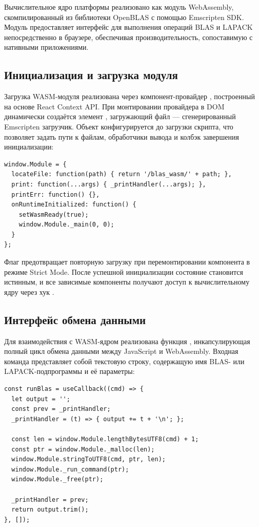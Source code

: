 \documentclass[12pt, oneside]{book}
\begin{document}
    \quad Вычислительное ядро платформы реализовано как модуль WebAssembly, скомпилированный из библиотеки OpenBLAS с помощью Emscripten SDK. Модуль предоставляет интерфейс для выполнения операций BLAS и LAPACK непосредственно в браузере, обеспечивая производительность, сопоставимую с нативными приложениями.

\subsection{Инициализация и загрузка модуля}

    \quad Загрузка WASM-модуля реализована через компонент-провайдер \texttt{}, построенный на основе React Context API. При монтировании провайдера в DOM динамически создаётся элемент \texttt{}, загружающий файл \texttt{} --- сгенерированный Emscripten загрузчик. Объект \texttt{} конфигурируется до загрузки скрипта, что позволяет задать пути к файлам, обработчики вывода и колбэк завершения инициализации:

\begin{verbatim}
window.Module = {
  locateFile: function(path) { return '/blas_wasm/' + path; },
  print: function(...args) { _printHandler(...args); },
  printErr: function() {},
  onRuntimeInitialized: function() {
    setWasmReady(true);
    window.Module._main(0, 0);
  }
};
\end{verbatim}

    \quad Флаг \texttt{} предотвращает повторную загрузку при перемонтировании компонента в режиме Strict Mode. После успешной инициализации состояние \texttt{} становится истинным, и все зависимые компоненты получают доступ к вычислительному ядру через хук \texttt{}.

\subsection{Интерфейс обмена данными}

    \quad Для взаимодействия с WASM-ядром реализована функция \texttt{}, инкапсулирующая полный цикл обмена данными между JavaScript и WebAssembly. Входная команда представляет собой текстовую строку, содержащую имя BLAS- или LAPACK-подпрограммы и её параметры:

\begin{verbatim}
const runBlas = useCallback((cmd) => {
  let output = '';
  const prev = _printHandler;
  _printHandler = (t) => { output += t + '\n'; };

  const len = window.Module.lengthBytesUTF8(cmd) + 1;
  const ptr = window.Module._malloc(len);
  window.Module.stringToUTF8(cmd, ptr, len);
  window.Module._run_command(ptr);
  window.Module._free(ptr);

  _printHandler = prev;
  return output.trim();
}, []);
\end{verbatim}
\end{document}
